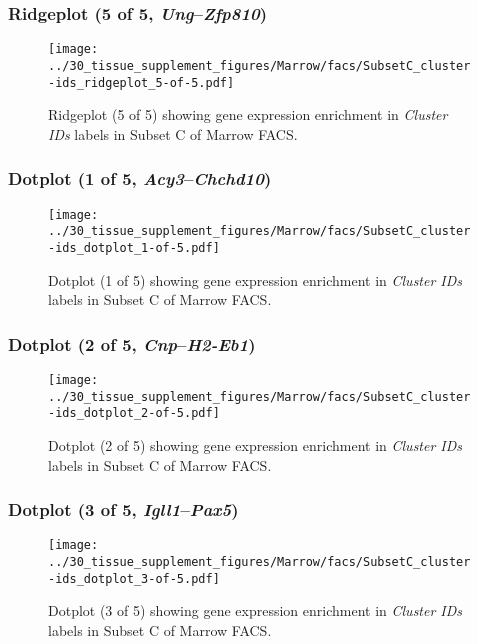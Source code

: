 \clearpage

\subsubsection{Ridgeplot (5 of 5, \emph{Ung}--\emph{Zfp810})}
\begin{figure}[h]
\centering
\texttt{[image: ../30\_tissue\_supplement\_figures/Marrow/facs/SubsetC\_cluster-ids\_ridgeplot\_5-of-5.pdf]}

\caption{ Ridgeplot (5 of 5)  showing gene expression enrichment in \emph{Cluster IDs} labels in Subset C of Marrow FACS. }
\end{figure}


\clearpage

\subsubsection{Dotplot (1 of 5, \emph{Acy3}--\emph{Chchd10})}
\begin{figure}[h]
\centering
\texttt{[image: ../30\_tissue\_supplement\_figures/Marrow/facs/SubsetC\_cluster-ids\_dotplot\_1-of-5.pdf]}

\caption{ Dotplot (1 of 5)  showing gene expression enrichment in \emph{Cluster IDs} labels in Subset C of Marrow FACS. }
\end{figure}


\clearpage

\subsubsection{Dotplot (2 of 5, \emph{Cnp}--\emph{H2-Eb1})}
\begin{figure}[h]
\centering
\texttt{[image: ../30\_tissue\_supplement\_figures/Marrow/facs/SubsetC\_cluster-ids\_dotplot\_2-of-5.pdf]}

\caption{ Dotplot (2 of 5)  showing gene expression enrichment in \emph{Cluster IDs} labels in Subset C of Marrow FACS. }
\end{figure}


\clearpage

\subsubsection{Dotplot (3 of 5, \emph{Igll1}--\emph{Pax5})}
\begin{figure}[h]
\centering
\texttt{[image: ../30\_tissue\_supplement\_figures/Marrow/facs/SubsetC\_cluster-ids\_dotplot\_3-of-5.pdf]}

\caption{ Dotplot (3 of 5)  showing gene expression enrichment in \emph{Cluster IDs} labels in Subset C of Marrow FACS. }
\end{figure}


